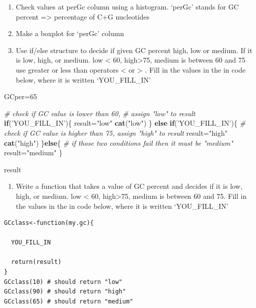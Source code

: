 \documentclass[12pt,]{krantz}
\newenvironment{Shaded}{\begin{snugshade}}{\end{snugshade}}
\newcommand{\CommentTok}[1]{\textcolor[rgb]{0.56,0.35,0.01}{\textit{#1}}}
\newcommand{\ControlFlowTok}[1]{\textcolor[rgb]{0.13,0.29,0.53}{\textbf{#1}}}
\newcommand{\DecValTok}[1]{\textcolor[rgb]{0.00,0.00,0.81}{#1}}
\newcommand{\KeywordTok}[1]{\textcolor[rgb]{0.13,0.29,0.53}{\textbf{#1}}}
\newcommand{\NormalTok}[1]{#1}
\newcommand{\StringTok}[1]{\textcolor[rgb]{0.31,0.60,0.02}{#1}}
\providecommand{\tightlist}{%
  \setlength{\itemsep}{0pt}\setlength{\parskip}{0pt}}
\theoremstyle{definition}
\theoremstyle{definition}
\theoremstyle{definition}
\theoremstyle{remark}
\begin{document}
\begin{enumerate}
\def\labelenumi{\arabic{enumi}.}
\setcounter{enumi}{43}
\item
  Check values at perGc column using a histogram. `perGc' stands for GC
  percent =\textgreater{} percentage of C+G nucleotides
\item
  Make a boxplot for `perGc' column
\item
  Use if/else structure to decide if given GC percent high, low or
  medium. If it is low, high, or medium. low \textless{} 60,
  high\textgreater{}75, medium is between 60 and 75 use greater or less
  than operators \textless{} or \textgreater{} . Fill in the values in
  the in code below, where it is written `YOU\_FILL\_IN'
\end{enumerate}

\begin{Shaded}
\begin{Highlighting}[]
\NormalTok{GCper=}\DecValTok{65}

  \CommentTok{# check if GC value is lower than 60, }
  \CommentTok{# assign "low" to result}
  \ControlFlowTok{if}\NormalTok{(}\StringTok{'YOU_FILL_IN'}\NormalTok{)\{}
\NormalTok{    result=}\StringTok{"low"}
    \KeywordTok{cat}\NormalTok{(}\StringTok{"low"}\NormalTok{)}
\NormalTok{  \}}
  \ControlFlowTok{else} \ControlFlowTok{if}\NormalTok{(}\StringTok{'YOU_FILL_IN'}\NormalTok{)\{  }\CommentTok{# check if GC value is higher than 75, assign "high" to result}
\NormalTok{    result=}\StringTok{"high"}
    \KeywordTok{cat}\NormalTok{(}\StringTok{"high"}\NormalTok{)}
\NormalTok{  \}}\ControlFlowTok{else}\NormalTok{\{ }\CommentTok{# if those two conditions fail then it must be "medium"}
\NormalTok{    result=}\StringTok{"medium"}
\NormalTok{  \}}

\NormalTok{result}
\end{Highlighting}
\end{Shaded}

\begin{enumerate}
\def\labelenumi{\arabic{enumi}.}
\setcounter{enumi}{43}
\tightlist
\item
  Write a function that takes a value of GC percent and decides if it is
  low, high, or medium. low \textless{} 60, high\textgreater{}75, medium
  is between 60 and 75. Fill in the values in the in code below, where
  it is written `YOU\_FILL\_IN'
\end{enumerate}

\begin{verbatim}
GCclass<-function(my.gc){
  
  YOU_FILL_IN
  
  return(result)
}
GCclass(10) # should return "low"
GCclass(90) # should return "high"
GCclass(65) # should return "medium"
\end{verbatim}
\end{document}
